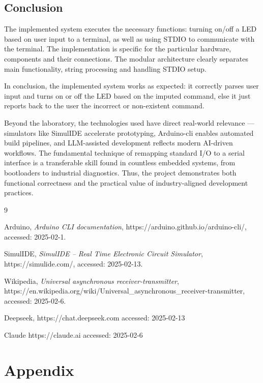 \documentclass[10pt,a4paper]{report}
\begin{document}
\subsection*{Conclusion}
The implemented system executes the necessary functions: turning on/off a LED based on user input to a terminal, as well as using
STDIO to communicate with the terminal. The implementation is specific for 
the particular hardware, components and their connections. The modular 
architecture clearly separates main functionality, string processing and 
handling STDIO setup.

In conclusion, the implemented system works as expected: it correctly parses
user input and turns on or off the LED based on the imputed command, else it
just reports back to the user the incorrect or non-existent command.

Beyond the laboratory, the technologies used have direct real-world relevance — simulators like SimulIDE accelerate prototyping, Arduino-cli enables automated build pipelines, and LLM-assisted development reflects modern AI-driven workflows. The fundamental technique of remapping standard I/O to a serial interface is a transferable skill found in countless embedded systems, from bootloaders to industrial diagnostics. Thus, the project demonstrates both functional correctness and the practical value of industry-aligned development practices.

\newpage
\begin{thebibliography}{9} %

Arduino,
\emph{Arduino CLI documentation},
https://arduino.github.io/arduino-cli/,
accessed: 2025-02-1.

SimulIDE,
\emph{SimulIDE – Real Time Electronic Circuit Simulator},
https://simulide.com/,
accessed: 2025-02-13.

Wikipedia,
\emph{Universal asynchronous receiver-transmitter},
https://en.wikipedia.org/wiki/Universal\_asynchronous\_receiver-transmitter,
accessed: 2025-02-6.

Deepseek, 
https://chat.deepseek.com
accessed: 2025-02-13

Claude
https://claude.ai
accessed: 2025-02-6

\end{thebibliography}

\newpage
\section*{Appendix}
\end{document}
